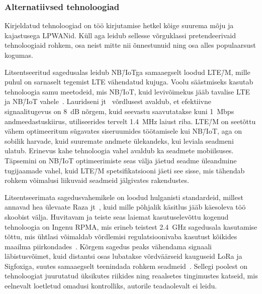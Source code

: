 \documentclass[12pt]{article}
\begin{document}
    \subsubsection{Alternatiivsed tehnoloogiad}

    Kirjeldatud tehnoloogiad on töö kirjutamise hetkel kõige suurema mõju ja kajastusega LPWANid.
    Küll aga leidub sellesse võrguklassi pretendeerivaid tehnoloogiaid rohkem, osa neist mitte nii õnnestunuid ning osa alles populaarsust kogumas.

    Litsentseeritud sagedusalas leidub NB\=/IoTga samaaegselt loodud LTE\=/M, mille puhul on sarnaselt tegemist LTE vähendatud kujuga.
    Voolu säästmiseks kasutab tehnoloogia samu meetodeid, mis NB\=/IoT, kuid levivõimekus jääb tavalise LTE ja NB\=/IoT vahele~\cite{benhiba2018comparative}.
    Lauridseni jt~\cite{lauridsen2016coverage} võrdlusest avaldub, et efektiivne signaalitugevus on \SI{8}{\deci\bel} nõrgem, kuid seevastu saavutatakse kuni 1~Mbps andmeedastuskiirus, utiliseerides tervelt \SI{1,4}{\mega\hertz} laiust riba.
    LTE\=/M on seetõttu vähem optimeeritum sügavates siseruumides töötamisele kui NB\=/IoT, aga on sobilik harvade, kuid suuremate andmete ülekandeks, kui leviala seadmeni ulatub.
    Erinevus kahe tehnoloogia vahel avaldub ka seadmete mobiilsuses.
    Täpsemini on NB\=/IoT optimeerimiste seas välja jäetud seadme üleandmine tugijaamade vahel, kuid LTE\=/M spetsifikatsiooni jäeti see sisse, mis tähendab rohkem võimalusi liikuvaid seadmeid jälgivates rakendustes.

    Litsentseerimata sagedusvahemikele on loodud hulganisti standardeid, millest annavad hea ülevaate Raza jt~\cite{raza}, kuid mille põhjalik käsitlus jääb käesoleva töö skoobist välja.
    Huvitavam ja teiste seas laiemat kasutuselevõttu kogenud tehnoloogia on Ingenu RPMA, mis erineb teistest \SI{2.4}{\giga\hertz} sagedusala kasutamise tõttu, mis ühtlasi võimaldab võrdlemisi regulatsioonivaba kasutust kõikides maailma piirkondades~\cite{queralta2019comparative}.
    Kõrgem sagedus peaks vähendama signaali läbistusvõimet, kuid distantsi osas lubatakse võrdväärseid kauguseid LoRa ja Sigfoxiga, suutes samaaegselt teenindada rohkem seadmeid~\cite{raza}.
    Sellegi poolest on tehnoloogiat juurutatud üksikutes riikides ning reaalsetes tingimustes katseid, mis eelnevalt loetletud omadusi kontrolliks, autorile teadaolevalt ei leidu.

    \def\tabularxcolumn#1{m{#1}}
\end{document}
